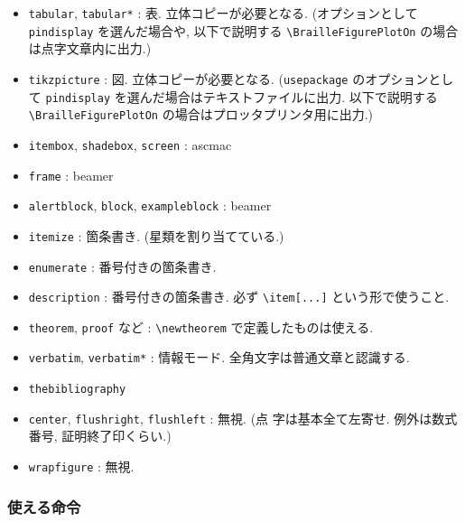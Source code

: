 \documentclass[lualatex,ja=standard,jafont=haranoaji]{bxjsarticle}
\begin{document}
\begin{itemize}
\item \verb|tabular|, \verb|tabular*| : 表. 立体コピーが必要となる. 
  (オプションとして \verb|pindisplay| を選んだ場合や, 以下で説明する \verb|\BrailleFigurePlotOn| の場合は点字文章内に出力.)
\item \verb|tikzpicture| : 図. 立体コピーが必要となる.
  (\verb|usepackage| のオプションとして \verb|pindisplay| を選んだ場合はテキストファイルに出力. 以下で説明する \verb|\BrailleFigurePlotOn| の場合はプロッタプリンタ用に出力.)
\item \verb|itembox|, \verb|shadebox|, \verb|screen| : ascmac
\item \verb|frame| : beamer
\item \verb|alertblock|, \verb|block|, \verb|exampleblock| : beamer
\item \verb|itemize| : 箇条書き. (星類を割り当てている.)
\item \verb|enumerate| : 番号付きの箇条書き.
\item \verb|description| : 番号付きの箇条書き. 必ず \verb|\item[...]| という形で使うこと.
\item \verb|theorem|, \verb|proof| など : \verb|\newtheorem| で定義したものは使える.
\item \verb|verbatim|, \verb|verbatim*| : 情報モード. 全角文字は普通文章と認識する.
\item \verb|thebibliography|
\item \verb|center|, \verb|flushright|, \verb|flushleft| : 無視. (点
字は基本全て左寄せ. 例外は数式番号, 証明終了印くらい.)
\item \verb|wrapfigure| : 無視.
\end{itemize}

\subsubsection{使える命令}
\end{document}
